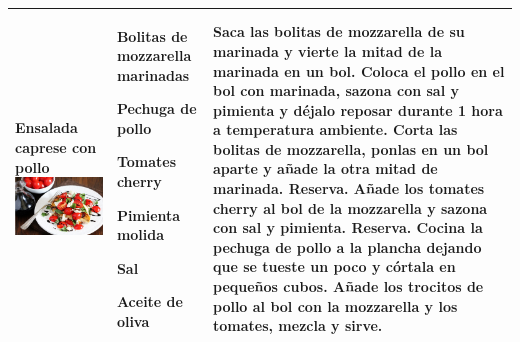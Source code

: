 \documentclass[menu.tex]{subfiles}
\begin{document}
\begin{tabular} {p{3.5cm} p{4cm} p{9cm}}
{        \rule{0pt}{2ex}Ensalada caprese con pollo\\
        \includegraphics[scale=0.26]{ensalada-caprese-con-pollo} 
    } & 
    \vspace{-1.6cm}
              
    \begin{compactitem} 
        \begin{scriptsize}
            \item Bolitas de mozzarella marinadas
            \item Pechuga de pollo
            \item Tomates cherry
            \item Pimienta molida
            \item Sal
            \item Aceite de oliva
        \end{scriptsize}
    \end{compactitem} &
    \vspace{-1.6cm}     
    Saca las bolitas de mozzarella de su marinada y vierte la mitad de la marinada en un bol.
    Coloca el pollo en el bol con marinada, sazona con sal y pimienta y déjalo reposar durante 1 hora a temperatura ambiente.
    Corta las bolitas de mozzarella, ponlas en un bol aparte y añade la otra mitad de marinada. Reserva.
    Añade los tomates cherry al bol de la mozzarella y sazona con sal y pimienta. Reserva.
    Cocina la pechuga de pollo a la plancha dejando que se tueste un poco y córtala en pequeños cubos.
    Añade los trocitos de pollo al bol con la mozzarella y los tomates, mezcla y sirve.\\
    \hline
    

\end{tabular}
\end{document}
